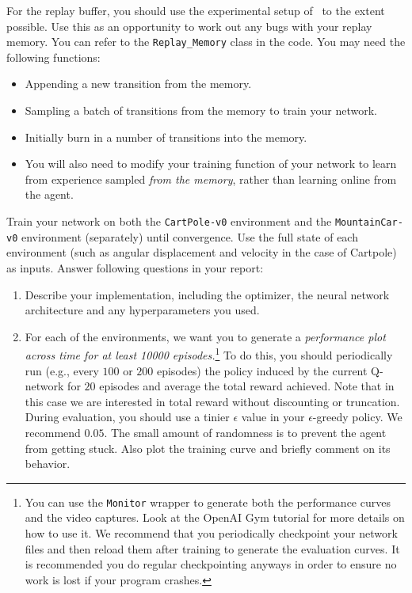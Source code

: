 \documentclass[12pt]{article}
\begin{document}
\begin{enumerate}[label=\textbf{4.\arabic*}]
   For the replay buffer, you should use the experimental setup of~\cite{mnih2013playing, mnih2015human} to the extent possible. Use this as an opportunity to work out any bugs with your replay memory.
    You can refer to the \texttt{Replay\_Memory} class in the code. You may need the following functions: 
    \begin{itemize}
        \item Appending a new transition from the memory. 
        \item Sampling a batch of transitions from the memory to train your network. 
        \item Initially burn in a number of transitions into the memory. 
        \item You will also need to modify your training function of your network to learn from experience sampled \textit{from the memory}, rather than learning online from the agent. 
    \end{itemize} 
    Train your network on both the \texttt{CartPole-v0} environment and the \texttt{MountainCar-v0} environment (separately) until convergence. Use the full state of each environment (such as angular displacement and velocity in the case of Cartpole) as inputs. Answer following questions in your report: 
    \begin{enumerate}
        \item Describe your implementation, including the optimizer, the neural network architecture and any hyperparameters you used.
        \item For each of the environments, we want you to generate a \emph{performance plot across time for at least 10000 episodes.}\footnote{You can use the \texttt{Monitor} wrapper to generate both the performance curves and the video captures. Look at the OpenAI Gym tutorial for more details on how to use it. We recommend that you periodically checkpoint your network files and then reload them after training to generate the evaluation curves. It is recommended you do regular checkpointing anyways in order to ensure no work is lost if your program crashes.}   To do this, you should periodically run (e.g., every $100$ or $200$ episodes) the policy induced by the current Q-network for $20$ episodes and average the total reward achieved. Note that in this case we are interested in total reward without discounting or truncation. During evaluation, you should use a tinier $\epsilon$ value in your $\epsilon$-greedy policy. We recommend $0.05$. The small amount of randomness is to prevent the agent from getting stuck.  Also plot the training curve and briefly comment on its behavior. 

\end{enumerate}
\end{enumerate}
\end{document}

